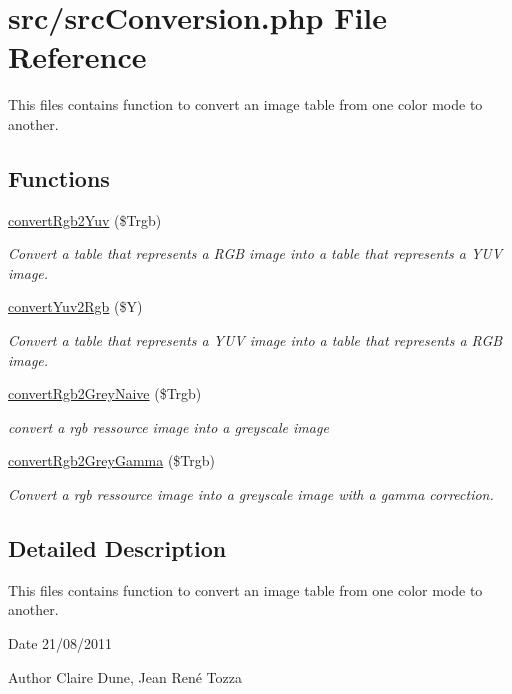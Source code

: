 \hypertarget{src_conversion_8php}{
\section{src/src\-Conversion.php \-File \-Reference}
\label{src_conversion_8php}
}


\-This files contains function to convert an image table from one color mode to another.  


\subsection*{\-Functions}
\begin{DoxyCompactItemize}
\item 
\hyperlink{src_conversion_8php_a9d507ec8fad6975eb365fe5524596296}{convert\-Rgb2\-Yuv} (\$\-Trgb)
\begin{DoxyCompactList}\small\item\em \-Convert a table that represents a \-R\-G\-B image into a table that represents a \-Y\-U\-V image. \end{DoxyCompactList}\item 
\hyperlink{src_conversion_8php_a3f02fa9c92cdb6e3d6051247f8590eec}{convert\-Yuv2\-Rgb} (\$\-Y)
\begin{DoxyCompactList}\small\item\em \-Convert a table that represents a \-Y\-U\-V image into a table that represents a \-R\-G\-B image. \end{DoxyCompactList}\item 
\hyperlink{src_conversion_8php_a8af5da8271cf7dce077cc4c83913a05a}{convert\-Rgb2\-Grey\-Naive} (\$\-Trgb)
\begin{DoxyCompactList}\small\item\em convert a rgb ressource image into a greyscale image \end{DoxyCompactList}\item 
\hyperlink{src_conversion_8php_ae7ea863aeec0e4ef860ba729dab60b12}{convert\-Rgb2\-Grey\-Gamma} (\$\-Trgb)
\begin{DoxyCompactList}\small\item\em \-Convert a rgb ressource image into a greyscale image with a gamma correction. \end{DoxyCompactList}\end{DoxyCompactItemize}


\subsection{\-Detailed \-Description}
\-This files contains function to convert an image table from one color mode to another. \begin{DoxyDate}{\-Date}
21/08/2011 
\end{DoxyDate}
\begin{DoxyAuthor}{\-Author}
\-Claire \-Dune, \-Jean \-René \-Tozza 
\end{DoxyAuthor}


